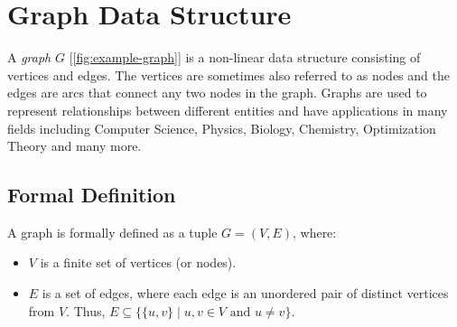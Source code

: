 \documentclass[../Thesis.tex]{subfiles}
\begin{document}
\section{Graph Data Structure}
\label{sec:graph_data_structure}

A \emph{graph} $G$ [\autoref{fig:example-graph}] is a non-linear data structure consisting of vertices and edges. The vertices are sometimes also referred to as nodes and the edges are arcs that connect any two nodes in the graph. Graphs are used to represent relationships between different entities and have applications in many fields including Computer Science, Physics, Biology, Chemistry, Optimization Theory and many more.


\subsection{Formal Definition}
A graph is formally defined as a tuple $G = (V, E)$, where:
\begin{itemize}
    \item $V$ is a finite set of vertices (or nodes).
    \item $E$ is a set of edges, where each edge is an unordered pair of distinct vertices from $V$. Thus, $E \subseteq \{\{u, v\} \mid u, v \in V \text{ and } u \neq v\}$.
\end{itemize}
\end{document}
